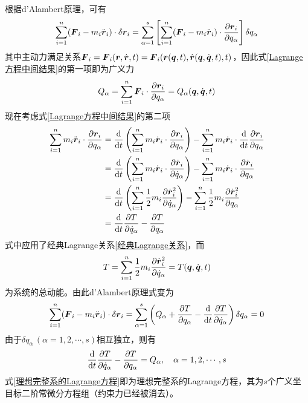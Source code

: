 根据d'Alambert原理，可有
\begin{equation}
	\sum_{i=1}^n (\boldsymbol{F}_i - m_i \ddot{\boldsymbol{r}}_i) \cdot \delta \boldsymbol{r}_i = \sum_{\alpha=1}^s \left[\sum_{i=1}^n (\boldsymbol{F}_i - m_i \ddot{\boldsymbol{r}}_i) \cdot \frac{\partial \boldsymbol{r}_i}{\partial q_\alpha}\right] \delta q_\alpha
	\label{Lagrange方程中间结果}
\end{equation}
其中主动力满足关系$\boldsymbol{F}_i = \boldsymbol{F}_i(\boldsymbol{r},\dot{\boldsymbol{r}},t) = \boldsymbol{F}_i(\boldsymbol{r}(\boldsymbol{q},t),\dot{\boldsymbol{r}}(\boldsymbol{q},\dot{\boldsymbol{q}},t),t)$，因此式\eqref{Lagrange方程中间结果}的第一项即为广义力
\begin{equation*}
	Q_\alpha = \sum_{i=1}^n \boldsymbol{F}_i \cdot \frac{\partial \boldsymbol{r}_i}{\partial q_\alpha} = Q_\alpha(\boldsymbol{q},\dot{\boldsymbol{q}},t)
\end{equation*}
现在考虑式\eqref{Lagrange方程中间结果}的第二项
\begin{align*}
	\sum_{i=1}^n m_i \ddot{\boldsymbol{r}}_i \cdot \frac{\partial \boldsymbol{r}_i}{\partial q_\alpha} & = \frac{\mathrm{d}}{\mathrm{d} t} \left(\sum_{i=1}^n m_i\dot{\boldsymbol{r}}_i \cdot \frac{\partial \boldsymbol{r}_i}{\partial q_\alpha}\right) - \sum_{i=1}^n m_i \dot{\boldsymbol{r}}_i \cdot \frac{\mathrm{d}}{\mathrm{d} t} \frac{\partial \boldsymbol{r}_i}{\partial q_\alpha} \\
	& = \frac{\mathrm{d}}{\mathrm{d} t} \left(\sum_{i=1}^n m_i\dot{\boldsymbol{r}}_i \cdot \frac{\partial \dot{\boldsymbol{r}}_i}{\partial \dot{q}_\alpha}\right) - \sum_{i=1}^n m_i \dot{\boldsymbol{r}}_i \cdot \frac{\partial \dot{\boldsymbol{r}}_i}{\partial q_\alpha} \\
	& = \frac{\mathrm{d}}{\mathrm{d} t} \left(\sum_{i=1}^n \frac12 m_i\frac{\partial \dot{\boldsymbol{r}}_i^2}{\partial \dot{q}_\alpha}\right) - \sum_{i=1}^n \frac12 m_i \frac{\partial \dot{\boldsymbol{r}}_i^2}{\partial q_\alpha} \\
	& = \frac{\mathrm{d}}{\mathrm{d} t} \frac{\partial T}{\partial \dot{q}_\alpha} - \frac{\partial T}{\partial q_\alpha}
\end{align*}
式中应用了经典Lagrange关系\eqref{经典Lagrange关系}，而
\begin{equation*}
	T = \sum_{i=1}^n \frac12 m_i\frac{\partial \dot{\boldsymbol{r}}_i^2}{\partial \dot{q}_\alpha} = T(\boldsymbol{q},\dot{\boldsymbol{q}},t)
\end{equation*}
为系统的总动能。由此d'Alambert原理式变为
\begin{equation*}
	\sum_{i=1}^n (\boldsymbol{F}_i - m_i \ddot{\boldsymbol{r}}_i) \cdot \delta \boldsymbol{r}_i = \sum_{\alpha=1}^s \left(Q_\alpha+\frac{\partial T}{\partial q_\alpha} - \frac{\mathrm{d}}{\mathrm{d} t} \frac{\partial T}{\partial \dot{q}_\alpha}\right) \delta q_\alpha = 0
\end{equation*}
由于$\delta q_\alpha\,(\alpha = 1,2,\cdots,s)$相互独立，则有
\begin{equation}
	\frac{\mathrm{d}}{\mathrm{d} t} \frac{\partial T}{\partial \dot{q}_\alpha} - \frac{\partial T}{\partial q_\alpha} = Q_\alpha,\quad \alpha = 1,2,\cdots,s
	\label{理想完整系的Lagrange方程}
\end{equation}
式\eqref{理想完整系的Lagrange方程}即为理想完整系的Lagrange方程，其为$s$个广义坐目标二阶常微分方程组（约束力已经被消去）。

